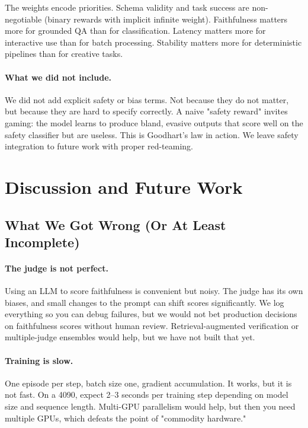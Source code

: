 \documentclass[11pt]{article}
\begin{document}
The weights encode priorities.
Schema validity and task success are non-negotiable (binary rewards with implicit infinite weight).
Faithfulness matters more for grounded QA than for classification.
Latency matters more for interactive use than for batch processing.
Stability matters more for deterministic pipelines than for creative tasks.

\paragraph{What we did not include.}
We did not add explicit safety or bias terms.
Not because they do not matter, but because they are hard to specify correctly.
A naive "safety reward" invites gaming: the model learns to produce bland, evasive outputs that score well on the safety classifier but are useless.
This is Goodhart's law in action.
We leave safety integration to future work with proper red-teaming.

\section{Discussion and Future Work}
\label{sec:discussion}

\subsection{What We Got Wrong (Or At Least Incomplete)}

\paragraph{The judge is not perfect.}
Using an LLM to score faithfulness is convenient but noisy.
The judge has its own biases, and small changes to the prompt can shift scores significantly.
We log everything so you can debug failures, but we would not bet production decisions on faithfulness scores without human review.
Retrieval-augmented verification or multiple-judge ensembles would help, but we have not built that yet.

\paragraph{Training is slow.}
One episode per step, batch size one, gradient accumulation.
It works, but it is not fast.
On a 4090, expect 2--3 seconds per training step depending on model size and sequence length.
Multi-GPU parallelism would help, but then you need multiple GPUs, which defeats the point of "commodity hardware."
\end{document}
